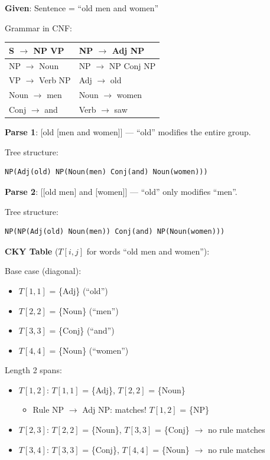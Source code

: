\documentclass[11pt,a4paper]{article}
\begin{document}
\begin{tcolorbox}[colback=green!5!white,colframe=green!75!black,title=\textbf{Worked Example 32: CKY Parsing with Ambiguity}]
\textbf{Given}: Sentence = ``old men and women''

Grammar in CNF:
\begin{center}
\begin{tabular}{|l|l|}
\hline
S $\to$ NP VP & NP $\to$ Adj NP \\ \hline
NP $\to$ Noun & NP $\to$ NP Conj NP \\ \hline
VP $\to$ Verb NP & Adj $\to$ old \\ \hline
Noun $\to$ men & Noun $\to$ women \\ \hline
Conj $\to$ and & Verb $\to$ saw \\ \hline
\end{tabular}
\end{center}

\textbf{Parse 1}: [old [men and women]] --- ``old'' modifies the entire group.

Tree structure:
\begin{verbatim}
NP(Adj(old) NP(Noun(men) Conj(and) Noun(women)))
\end{verbatim}

\textbf{Parse 2}: [[old men] and [women]] --- ``old'' only modifies ``men''.

Tree structure:
\begin{verbatim}
NP(NP(Adj(old) Noun(men)) Conj(and) NP(Noun(women)))
\end{verbatim}

\textbf{CKY Table} ($T[i,j]$ for words ``old men and women''):

Base case (diagonal):
\begin{itemize}
    \item $T[1,1]$ = \{Adj\} (``old'')
    \item $T[2,2]$ = \{Noun\} (``men'')
    \item $T[3,3]$ = \{Conj\} (``and'')
    \item $T[4,4]$ = \{Noun\} (``women'')
\end{itemize}

Length 2 spans:
\begin{itemize}
    \item $T[1,2]$: $T[1,1]$ = \{Adj\}, $T[2,2]$ = \{Noun\}
    \begin{itemize}
        \item Rule NP $\to$ Adj NP: matches! $T[1,2]$ = \{NP\}
    \end{itemize}
    \item $T[2,3]$: $T[2,2]$ = \{Noun\}, $T[3,3]$ = \{Conj\} $\to$ no rule matches
    \item $T[3,4]$: $T[3,3]$ = \{Conj\}, $T[4,4]$ = \{Noun\} $\to$ no rule matches
\end{itemize}


\end{tcolorbox}
\end{document}
